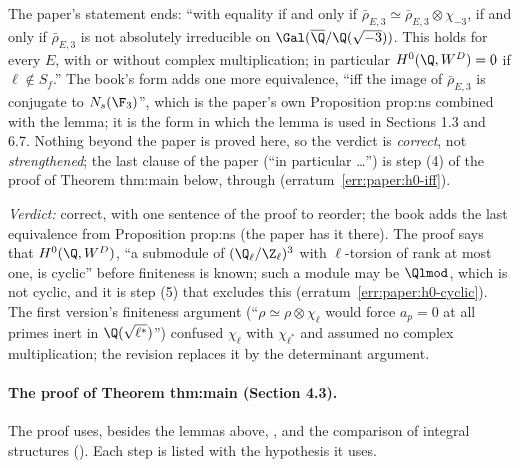 \begin{sloppypar}
\begin{warning}\label{warn:paper:h0}
The paper's statement ends: ``with equality if and only if $\bar\rho_{E,3}\simeq\bar\rho_{E,3}\otimes\chi_{-3}$, if and only if $\bar\rho_{E,3}$ is not absolutely irreducible on
$\Gal(\overline\Q/\Q(\sqrt{-3}))$. This holds for every $E$, with or without complex multiplication; in particular $H^0(\Q,W^D)=0$ if $\ell\notin S_f$.'' The book's form adds one more
equivalence, ``iff the image of $\bar\rho_{E,3}$ is conjugate to $N_s(\F_3)$'', which is the paper's own Proposition prop:ns combined with the lemma; it is the form in which the lemma is
used in Sections 1.3 and 6.7. Nothing beyond the paper is proved here, so the verdict is \emph{correct}, not \emph{strengthened}; the last clause of the paper (``in particular \dots'') is
step (4) of the proof of Theorem thm:main below, through  (erratum~\ref{err:paper:h0-iff}).
\end{warning}

\noindent\emph{Verdict:} correct, with one sentence of the proof to reorder; the book adds the last equivalence from Proposition prop:ns (the paper has it there). The proof says that
$H^0(\Q,W^D)$, ``a submodule of $(\Q_\ell/\Z_\ell)^3$ with $\ell$-torsion of rank at most one, is cyclic'' before finiteness is known; such a module may be $\Qlmod$, which is not cyclic,
and it is step (5) that excludes this (erratum~\ref{err:paper:h0-cyclic}). The first version's finiteness argument (``$\rho\simeq\rho\otimes\chi_\ell$ would force $a_p=0$ at all primes inert in
$\Q(\sqrt{\ell^*})$'') confused $\chi_\ell$ with $\chi_{\ell^*}$ and assumed no complex multiplication; the revision replaces it by the determinant argument.

\paragraph{The proof of Theorem thm:main (Section 4.3).} The proof uses, besides the lemmas above, ,
\cite[Theorem 2.2]{ARS12} and the comparison of integral structures (). Each step is listed with the hypothesis it uses.


\end{sloppypar}

